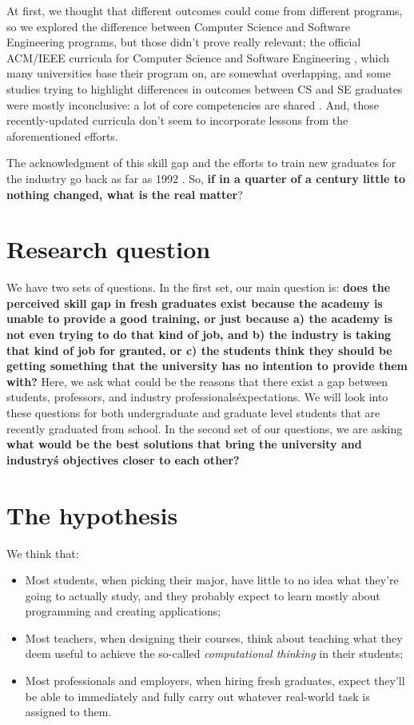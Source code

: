 \documentclass{sigchi}
\begin{document}
At first, we thought that different outcomes could come from different programs, so we explored the difference between Computer Science and Software Engineering programs, but those didn't prove really relevant; the official ACM/IEEE curricula for Computer Science \cite{Force2013} and Software Engineering \cite{Ardis2015}, which many universities base their program on, are somewhat overlapping, and some studies trying to highlight differences in outcomes between CS and SE graduates were mostly inconclusive: a lot of core competencies are shared \cite{Meziane2004} \cite{Rasool2014}. And, those recently-updated curricula don't seem to incorporate lessons from the aforementioned efforts.

The acknowledgment of this skill gap and the efforts to train new graduates for the industry go back as far as 1992 \cite{Dawson1992}. So, \textbf{if in a quarter of a century little to nothing changed, what is the real matter}?

\section{Research question}
We have two sets of questions. In the first set, our main question is: \textbf{does the perceived skill gap in fresh graduates exist because the academy is unable to provide a good training, or just because a) the academy is not even trying to do that kind of job, and b) the industry is taking that kind of job for granted, or c) the students think they should be getting something that the university has no intention to provide them with?} Here, we ask what could be the reasons that there exist a gap between students, professors, and industry professionals\' expectations. We will look into these questions for both undergraduate and graduate level students that are recently graduated from school.\newline
In the second set of our questions, we are asking \textbf{what would be the best solutions that bring the university and industry\'s objectives closer to each other?} 

\section{The hypothesis}
We think that:
\begin{itemize}
\item Most students, when picking their major, have little to no idea what they're going to actually study, and they probably expect to learn mostly about programming and creating applications;
\item Most teachers, when designing their courses, think about teaching what they deem useful to achieve the so-called \textit{computational thinking} in their students;
\item Most professionals and employers, when hiring fresh graduates, expect they'll be able to immediately and fully carry out whatever real-world task is assigned to them.
\end{itemize}
\end{document}
